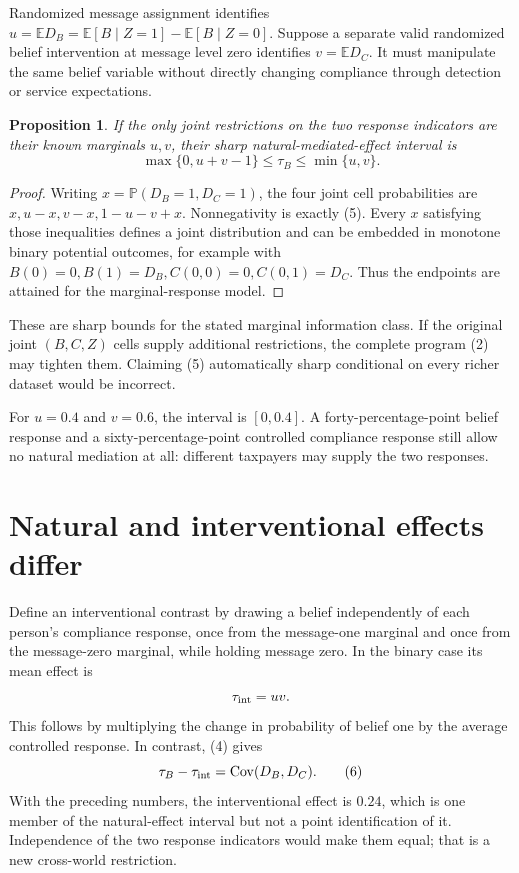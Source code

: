 \documentclass[11pt,a4paper]{article}
\newtheorem{proposition}[theorem]{Proposition}
\newcommand{\E}{\mathbb E}
\newcommand{\Prob}{\mathbb P}
\DeclareMathOperator{\Cov}{Cov}
\begin{document}
Randomized message assignment identifies
$u=\E D_B=\E[B\mid Z=1]-\E[B\mid Z=0]$.
Suppose a separate valid randomized belief intervention at message level zero identifies
$v=\E D_C$. It must manipulate the same belief variable without directly changing compliance through detection or service expectations.

\begin{proposition}
If the only joint restrictions on the two response indicators are their known marginals $u,v$, their sharp natural-mediated-effect interval is
\[
 \max\{0,u+v-1\}\le\tau_B\le\min\{u,v\}.
 \tag{5}
\]
\end{proposition}
\begin{proof}
Writing $x=\Prob(D_B=1,D_C=1)$, the four joint cell probabilities are
$x,u-x,v-x,1-u-v+x$. Nonnegativity is exactly (5). Every $x$ satisfying those inequalities defines a joint distribution and can be embedded in monotone binary potential outcomes, for example with $B(0)=0,B(1)=D_B,C(0,0)=0,C(0,1)=D_C$. Thus the endpoints are attained for the marginal-response model.
\end{proof}
These are sharp bounds for the stated marginal information class. If the original joint $(B,C,Z)$ cells supply additional restrictions, the complete program (2) may tighten them. Claiming (5) automatically sharp conditional on every richer dataset would be incorrect.

For $u=0.4$ and $v=0.6$, the interval is $[0,0.4]$. A forty-percentage-point belief response and a sixty-percentage-point controlled compliance response still allow no natural mediation at all: different taxpayers may supply the two responses.
\section{Natural and interventional effects differ}
Define an interventional contrast by drawing a belief independently of each person's compliance response, once from the message-one marginal and once from the message-zero marginal, while holding message zero. In the binary case its mean effect is
\[
 \tau_{\rm int}=uv.
\]
This follows by multiplying the change in probability of belief one by the average controlled response. In contrast, (4) gives
\[
 \tau_B-\tau_{\rm int}=\Cov(D_B,D_C).
 \tag{6}
\]
With the preceding numbers, the interventional effect is $0.24$, which is one member of the natural-effect interval but not a point identification of it. Independence of the two response indicators would make them equal; that is a new cross-world restriction.
\end{document}
